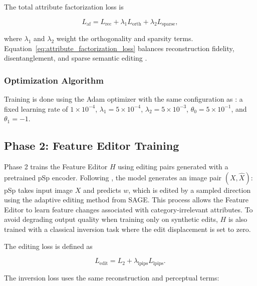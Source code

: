 The total attribute factorization loss is

\begin{equation}
    L_{\mathrm{af}} = L_{\mathrm{rec}} + \lambda_1 L_{\mathrm{orth}} + \lambda_2 L_{\mathrm{sparse}},
    \label{eq:attribute_factorization_loss}
\end{equation}

where $\lambda_1$ and $\lambda_2$ weight the orthogonality and sparsity terms. Equation~\eqref{eq:attribute_factorization_loss} balances reconstruction fidelity, disentanglement, and sparse semantic editing \citep{ding2023stableattributegroupediting}.

\subsubsection{Optimization Algorithm}

Training is done using the Adam optimizer with the same configuration as \citet{ding2023stableattributegroupediting}: a fixed learning rate of $1 \times 10^{-4}$, $\lambda_1 = 5 \times 10^{-4}$, $\lambda_2 = 5 \times 10^{-3}$, $\theta_0 = 5 \times 10^{-1}$, and $\theta_1 = -1$.

\subsection{Phase 2: Feature Editor Training}

Phase 2 trains the Feature Editor $H$ using editing pairs generated with a pretrained pSp encoder. Following \citet{bobkov2024devildetailsstylefeatureeditordetailrich}, the model generates an image pair $(X, \hat{X})$: pSp takes input image $X$ and predicts $w$, which is edited by a sampled direction using the adaptive editing method from SAGE. This process allows the Feature Editor to learn feature changes associated with category-irrelevant attributes. To avoid degrading output quality when training only on synthetic edits, $H$ is also trained with a classical inversion task where the edit displacement is set to zero.

The editing loss is defined as

\begin{equation}
    L_{\mathrm{edit}} = L_2 + \lambda_{\mathrm{lpips}} L_{\mathrm{lpips}}.
    \label{eq:editing_loss}
\end{equation}

The inversion loss uses the same reconstruction and perceptual terms:

